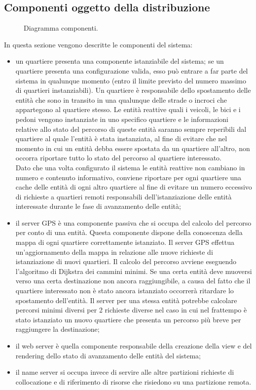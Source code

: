 \subsection{Componenti oggetto della distribuzione}
\begin{figure}[H] %
\caption{Diagramma componenti.}
\label{fig:speciation}
\end{figure}
In questa sezione vengono descritte le componenti del sistema:
\begin{itemize}
\item un quartiere presenta una componente istanziabile del sistema; se un quartiere presenta una configurazione valida, esso può entrare a far parte del sistema in qualunque momento (entro il limite previsto del numero massimo di quartieri instanziabili). Un quartiere è responsabile dello spostamento delle entità che sono in transito in una qualunque delle strade o incroci che appartegono al quartiere stesso. Le entità reattive quali i veicoli, le bici e i pedoni vengono instanziate in uno specifico quartiere e le informazioni relative allo stato del percorso di queste entità saranno sempre reperibili dal quartiere al quale l'entità è stata instanziata, al fine di evitare che nel momento in cui un entità debba essere spostata da un quartiere all'altro, non occorra riportare tutto lo stato del percorso al quartiere interessato.\\
Dato che una volta configurato il sistema le entità reattive non cambiano in numero e contenuto informativo, conviene riportare per ogni quartiere una cache delle entità di ogni altro quartiere al fine di evitare un numero eccessivo di richieste a quartieri remoti responsabili dell'istanziazione delle entità interessate durante le fase di avanzamento delle entità;
\item il server GPS è una componente passiva che si occupa del calcolo del percorso per conto di una entità. Questa componente dispone della conoscenza della mappa di ogni quartiere correttamente istanziato. Il server GPS effettua un'aggiornamento della mappa in relazione alle nuove richieste di istanziazione di nuovi quartieri. Il calcolo del percorso avviene eseguendo l'algoritmo di Dijkstra dei cammini minimi. Se una certa entità deve muoversi verso una certa destinazione non ancora raggiungibile, a causa del fatto che il quartiere interessato non è stato ancora istanziato occorrerà ritardare lo spostamento dell'entità. Il server per una stessa entità potrebbe calcolare percorsi minimi diversi per 2 richieste diverse nel caso in cui nel frattempo è stato istanziato un nuovo quartiere che presenta un percorso più breve per raggiungere la destinazione;
\item il web server è quella componente responsabile della creazione della view e del rendering dello stato di avanzamento delle entità del sistema;
\item il name server si occupa invece di servire alle altre partizioni richieste di collocazione e di riferimento di risorse che risiedono su una partizione remota.
\end{itemize}